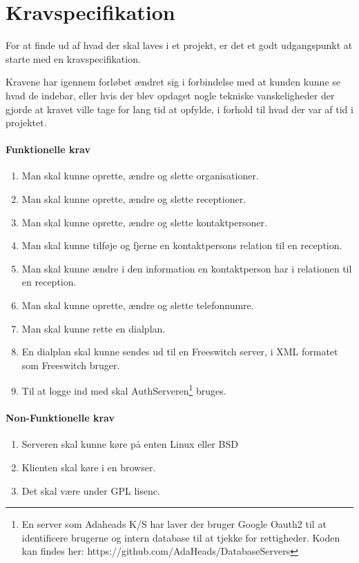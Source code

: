 \section{Kravspecifikation}
For at finde ud af hvad der skal laves i et projekt, er det et godt udgangs\-punkt at starte med en kravspecifikation.

Kravene har igennem forløbet ændret sig i forbindelse med at kunden kunne se hvad de indebar, eller hvis der blev opdaget nogle tekniske vanskeligheder der gjorde at kravet ville tage for lang tid at opfylde, i forhold til hvad der var af tid i projektet.

\paragraph{Funktionelle krav}
\begin{enumerate}
  \item[F 1.] Man skal kunne oprette, ændre og slette organisationer.
  \item[F 2.] Man skal kunne oprette, ændre og slette receptioner.
  \item[F 3.] Man skal kunne oprette, ændre og slette kontaktpersoner.
  \item[F 4.] Man skal kunne tilføje og fjerne en kontaktpersons relation til en reception.
  \item[F 5.] Man skal kunne ændre i den information en kontaktperson har i relationen til en reception.
  \item[F 6.] Man skal kunne oprette, ændre og slette telefonnumre.
  \item[F 7.] Man skal kunne rette en dialplan.
  \item[F 8.] En dialplan skal kunne sendes ud til en Freeswitch server, i XML formatet som Freeswitch bruger.
  \item[F 9.] Til at logge ind med skal AuthServeren\footnote{En server som Adaheads K/S har laver der bruger Google Oauth2 til at identificere brugerne og intern database til at tjekke for rettigheder. Koden kan findes her: \mbox{https://github.com/AdaHeads/DatabaseServers}} bruges.
\end{enumerate}

\paragraph{Non-Funktionelle krav}
\begin{enumerate}
  \item[NF 1.] Serveren skal kunne køre på enten Linux eller BSD
  \item[NF 2.] Klienten skal køre i en browser.
  \item[NF 3.] Det skal være under GPL lisenc.
\end{enumerate}

